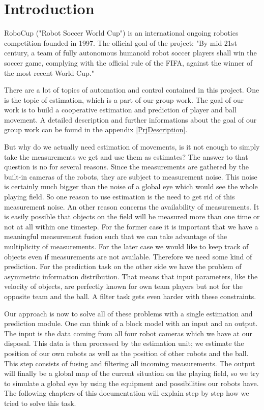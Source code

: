 
\chapter{Introduction}
RoboCup ("Robot Soccer World Cup") is an international ongoing robotics competition founded in 1997. The official goal of the project: "By mid-21st century, a team of fully autonomous humanoid robot soccer players shall win the soccer game, complying with the official rule of the FIFA, against the winner of the most recent World Cup." \cite{wwwRoboCup}
\parskip 0pt

There are a lot of topics of automation and control contained in this project. One is the topic of estimation, which is a part of our group work. The goal of our work is to build a cooperative estimation and prediction of player and ball movement. A detailed description and further informations about the goal of our group work can be found in the appendix \ref{PrjDescription}.

But why do we actually need estimation of movements, is it not enough to simply take the measurements we get and use them as estimates? The answer to that question is no for several reasons. Since the measurements are gathered by the built-in cameras of the robots, they are subject to measurement noise. This noise is certainly much bigger than the noise of a global eye which would see the whole playing field. So one reason to use estimation is the need to get rid of this measurement noise. An other reason concerns the availability of measurements. It is easily possible that objects on the field will be measured more than one time or not at all within one timestep. For the former case it is important that we have a meaningful measurement fusion such that we can take advantage of the multiplicity of measurements. For the later case we would like to keep track of objects even if measurements are not available. Therefore we need some kind of prediction. For the prediction task on the other side we have the problem of asymmetric information distribution. That means that input parameters, like the velocity of objects, are perfectly known for own team players but not for the opposite team and the ball. A filter task gets even harder with these constraints.

Our approach is now to solve all of these problems with a single estimation and prediction module. One can think of a block model with an input and an output. The input is the data coming from all four robot cameras which we have at our disposal. This data is then processed by the estimation unit; we estimate the position of our own robots as well as the position of other robots and the ball. This step consists of fusing and filtering all incoming measurements. The output will finally be a global map of the current situation on the playing field, so we try to simulate a global eye by using the equipment and possibilities our robots have. The following chapters of this documentation will explain step by step how we tried to solve this task.

